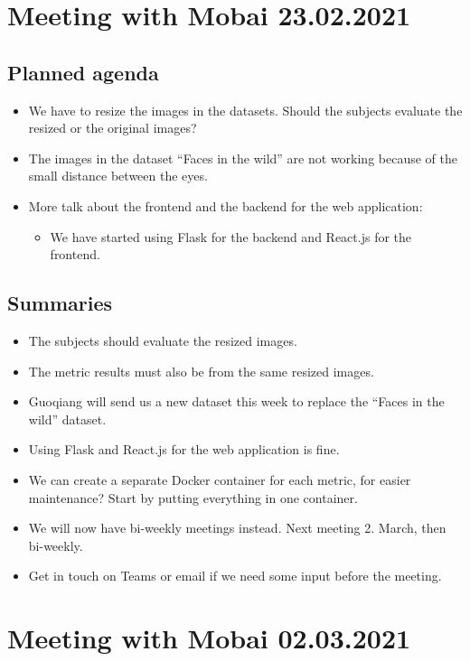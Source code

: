 \section*{Meeting with Mobai 23.02.2021}
\subsection*{Planned agenda}
\begin{itemize}
    \item We have to resize the images in the datasets. Should the subjects evaluate the resized or the original images?
    \item The images in the dataset “Faces in the wild” are not working because of the small distance between the eyes.
    \item More talk about the frontend and the backend for the web application:
    \begin{itemize}
        \item We have started using Flask for the backend and React.js for the frontend.
    \end{itemize}
\end{itemize}

\subsection*{Summaries}
\begin{itemize}
    \item The subjects should evaluate the resized images. 
    \item The metric results must also be from the same resized images.
    \item Guoqiang will send us a new dataset this week to replace the “Faces in the wild” dataset.
    \item Using Flask and React.js for the web application is fine.
    \item We can create a separate Docker container for each metric, for easier maintenance? Start by putting everything in one container.
    \item We will now have bi-weekly meetings instead. Next meeting 2. March, then bi-weekly.
    \item Get in touch on Teams or email if we need some input before the meeting.
\end{itemize}


\section*{Meeting with Mobai 02.03.2021}
